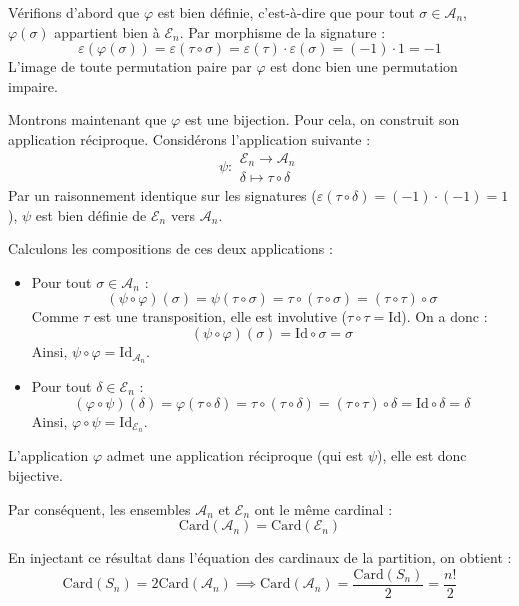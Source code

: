 \documentclass[11pt, a4paper]{article}
\theoremstyle{definition}
\begin{document}
Vérifions d'abord que $\varphi$ est bien définie, c'est-à-dire que pour tout $\sigma \in \mathcal{A}_n$, $\varphi(\sigma)$ appartient bien à $\mathcal{E}_n$. Par morphisme de la signature :
$$\varepsilon(\varphi(\sigma)) = \varepsilon(\tau \circ \sigma) = \varepsilon(\tau) \cdot \varepsilon(\sigma) = (-1) \cdot 1 = -1$$
L'image de toute permutation paire par $\varphi$ est donc bien une permutation impaire.

Montrons maintenant que $\varphi$ est une bijection. Pour cela, on construit son application réciproque. Considérons l'application suivante :
$$\psi : \begin{matrix} \mathcal{E}_n \to \mathcal{A}_n \\ \delta \mapsto \tau \circ \delta \end{matrix}$$
Par un raisonnement identique sur les signatures ($\varepsilon(\tau \circ \delta) = (-1) \cdot (-1) = 1$), $\psi$ est bien définie de $\mathcal{E}_n$ vers $\mathcal{A}_n$.

Calculons les compositions de ces deux applications :
\begin{itemize}
	\item Pour tout $\sigma \in \mathcal{A}_n$ :
	$$(\psi \circ \varphi)(\sigma) = \psi(\tau \circ \sigma) = \tau \circ (\tau \circ \sigma) = (\tau \circ \tau) \circ \sigma$$
	Comme $\tau$ est une transposition, elle est involutive ($\tau \circ \tau = \mathrm{Id}$). On a donc :
	$$(\psi \circ \varphi)(\sigma) = \mathrm{Id} \circ \sigma = \sigma$$
	Ainsi, $\psi \circ \varphi = \mathrm{Id}_{\mathcal{A}_n}$.

	\item Pour tout $\delta \in \mathcal{E}_n$ :
	$$(\varphi \circ \psi)(\delta) = \varphi(\tau \circ \delta) = \tau \circ (\tau \circ \delta) = (\tau \circ \tau) \circ \delta = \mathrm{Id} \circ \delta = \delta$$
	Ainsi, $\varphi \circ \psi = \mathrm{Id}_{\mathcal{E}_n}$.
\end{itemize}

L'application $\varphi$ admet une application réciproque (qui est $\psi$), elle est donc bijective. 

Par conséquent, les ensembles $\mathcal{A}_n$ et $\mathcal{E}_n$ ont le même cardinal :
$$\mathrm{Card}(\mathcal{A}_n) = \mathrm{Card}(\mathcal{E}_n)$$

En injectant ce résultat dans l'équation des cardinaux de la partition, on obtient :
$$\mathrm{Card}(S_n) = 2 \mathrm{Card}(\mathcal{A}_n) \implies \mathrm{Card}(\mathcal{A}_n) = \frac{\mathrm{Card}(S_n)}{2} = \frac{n!}{2}$$
\end{document}
